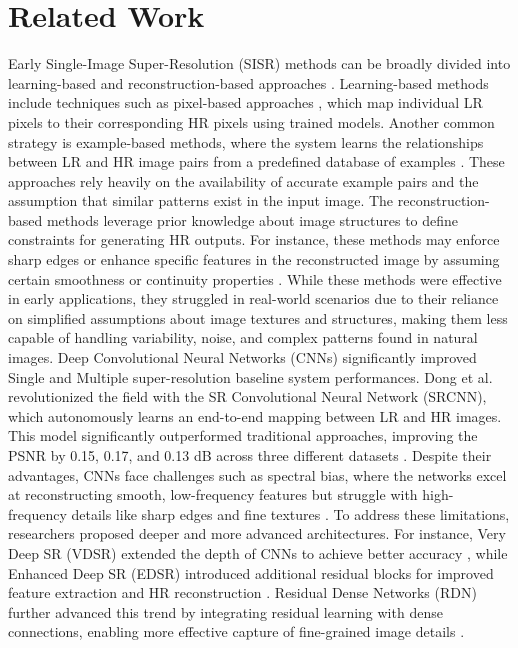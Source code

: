 \section{Related Work}
\label{sec-related}
Early Single-Image Super-Resolution (SISR) methods can be broadly divided into learning-based and reconstruction-based approaches \cite{Yang2010}. Learning-based methods include techniques such as pixel-based approaches \cite{Zhang2012}, which map individual LR pixels to their corresponding HR pixels using trained models. Another common strategy is example-based methods, where the system learns the relationships between LR and HR image pairs from a predefined database of examples \cite{freeman2002}. These approaches rely heavily on the availability of accurate example pairs and the assumption that similar patterns exist in the input image. The reconstruction-based methods leverage prior knowledge about image structures to define constraints for generating HR outputs. For instance, these methods may enforce sharp edges or enhance specific features in the reconstructed image by assuming certain smoothness or continuity properties \cite{Dai2007, Aly2005}. While these methods were effective in early applications, they struggled in real-world scenarios due to their reliance on simplified assumptions about image textures and structures, making them less capable of handling variability, noise, and complex patterns found in natural images. Deep Convolutional Neural Networks (CNNs) significantly improved Single and Multiple super-resolution baseline system performances. Dong et al. \cite{Dong2016} revolutionized the field with the SR Convolutional Neural Network (SRCNN), which autonomously learns an end-to-end mapping between LR and HR images. This model significantly outperformed traditional approaches, improving the PSNR by 0.15, 0.17, and 0.13 dB across three different datasets \cite{Dong2016}. Despite their advantages, CNNs face challenges such as spectral bias, where the networks excel at reconstructing smooth, low-frequency features but struggle with high-frequency details like sharp edges and fine textures \cite{Zhang2019}. To address these limitations, researchers proposed deeper and more advanced architectures. For instance, Very Deep SR (VDSR) extended the depth of CNNs to achieve better accuracy \cite{Kim2016VDSR}, while Enhanced Deep SR (EDSR) introduced additional residual blocks for improved feature extraction and HR reconstruction \cite{Kim2016EDSR}. Residual Dense Networks (RDN) further advanced this trend by integrating residual learning with dense connections, enabling more effective capture of fine-grained image details \cite{Zhang2018}.

